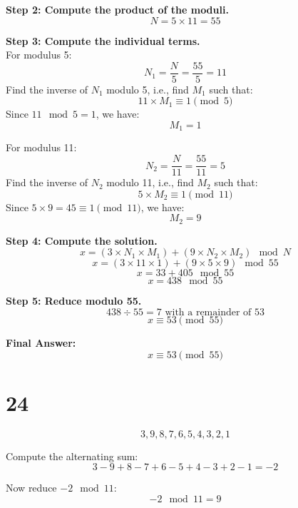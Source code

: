 \documentclass[12pt]{article}
\begin{document}
\textbf{Step 2: Compute the product of the moduli.} \\
\[
N = 5 \times 11 = 55
\]

\textbf{Step 3: Compute the individual terms.} \\
For modulus 5:
\[
N_1 = \frac{N}{5} = \frac{55}{5} = 11
\]
Find the inverse of \( N_1 \) modulo 5, i.e., find \( M_1 \) such that:
\[
11 \times M_1 \equiv 1 \pmod{5}
\]
Since \( 11 \mod 5 = 1 \), we have:
\[
M_1 = 1
\]

For modulus 11:
\[
N_2 = \frac{N}{11} = \frac{55}{11} = 5
\]
Find the inverse of \( N_2 \) modulo 11, i.e., find \( M_2 \) such that:
\[
5 \times M_2 \equiv 1 \pmod{11}
\]
Since \( 5 \times 9 = 45 \equiv 1 \pmod{11} \), we have:
\[
M_2 = 9
\]

\textbf{Step 4: Compute the solution.} \\
\[
x = (3 \times N_1 \times M_1) + (9 \times N_2 \times M_2) \mod N
\]
\[
x = (3 \times 11 \times 1) + (9 \times 5 \times 9) \mod 55
\]
\[
x = 33 + 405 \mod 55
\]
\[
x = 438 \mod 55
\]

\textbf{Step 5: Reduce modulo 55.} \\
\[
438 \div 55 = 7 \text{ with a remainder of } 53
\]
\[
x \equiv 53 \pmod{55}
\]

\textbf{Final Answer:} \\
\[
x \equiv 53 \pmod{55}
\]


\newpage
%

\section*{24}
\[
3, 9, 8, 7, 6, 5, 4, 3, 2, 1
\]

Compute the alternating sum:
\[
3 - 9 + 8 - 7 + 6 - 5 + 4 - 3 + 2 - 1 = -2
\]

Now reduce \( -2 \mod 11 \):
\[
-2 \mod 11 = 9
\]
\end{document}
